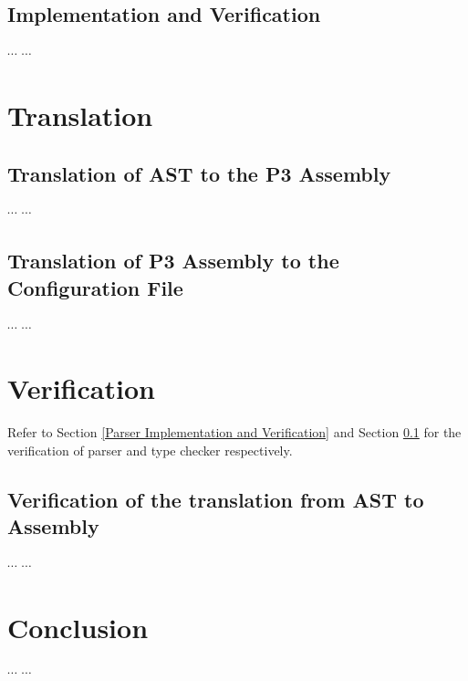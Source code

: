 \documentclass{article}
\begin{document}
\subsection{Implementation and Verification} \label{Type-checker Implementation and Verification}

\begin{flushleft}
$\cdots$ $\cdots$
\end{flushleft}

\section{Translation}

\subsection{Translation of AST to the P3 Assembly}

$\cdots$ $\cdots$

\subsection{Translation of P3 Assembly to the Configuration File}

$\cdots$ $\cdots$


\section{Verification}

Refer to Section \ref{Parser Implementation and Verification} and Section \ref{Type-checker Implementation and Verification}  for the verification of parser and type checker respectively.


\subsection{Verification of the translation from AST to Assembly}

$\cdots$ $\cdots$


\section{Conclusion}

$\cdots$ $\cdots$
\end{document}
